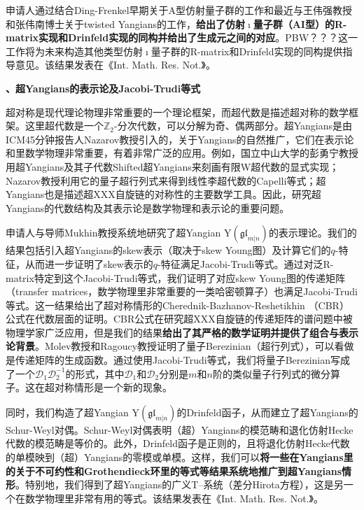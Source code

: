 \documentclass[12pt,UTF8,AutoFakeBold=4,a4paper]{ctexart}
\begin{document}
申请人通过结合Ding-Frenkel早期关于A型仿射量子群的工作和最近与王伟强教授和张伟南博士关于twisted Yangians的工作，\textbf{给出了仿射$\imath$量子群（AI型）的R-matrix实现和Drinfeld实现的同构并给出了生成元之间的对应}。PBW？？？这一工作将为未来构造其他类型仿射$\imath$量子群的R-matrix和Drinfeld实现的同构提供指导意见。该结果发表在《Int. Math. Res. Not.》。

\medskip

\textbf{、超Yangians的表示论及Jacobi-Trudi等式}

超对称是现代理论物理非常重要的一个理论框架，而超代数是描述超对称的数学框架。这里超代数是一个$\mathbb Z_2$-分次代数，可以分解为奇、偶两部分。超Yangians是由ICM45分钟报告人Nazarov教授引入的，关于Yangians的自然推广，它们在表示论和里数学物理非常重要，有着非常广泛的应用。例如，国立中山大学的彭勇宁教授用超Yangians及其子代数Shifted超Yangians来刻画有限W超代数的显式实现；Nazarov教授利用它的量子超行列式来得到线性李超代数的Capelli等式；超Yangians也是描述超XXX自旋链的对称性的主要数学工具。因此，研究超Yangians的代数结构及其表示论是数学物理和表示论的重要问题。

申请人与导师Mukhin教授系统地研究了超Yangian $\mathrm{Y}(\mathfrak{gl}_{m|n})$的表示理论。我们的结果包括引入超Yangians的skew表示（取决于skew Young图）及计算它们的$q$-特征，从而进一步证明了skew表示的$q$-特征满足Jacobi-Trudi等式。通过对泛R-matrix特定到这个Jacobi-Trudi等式，我们证明了对应skew Young图的传递矩阵（transfer matrices，数学物理里非常重要的一类哈密顿算子）也满足Jacobi-Trudi等式。这一结果给出了超对称情形的Cherednik-Bazhanov-Reshetikhin （CBR）公式在代数层面的证明。CBR公式在研究超XXX自旋链的传递矩阵的谱问题中被物理学家广泛应用，但是我们的结果\textbf{给出了其严格的数学证明并提供了组合与表示论背景}。Molev教授和Ragoucy教授证明了量子Berezinian（超行列式），可以看做是传递矩阵的生成函数。通过使用Jacobi-Trudi等式，我们将量子Berezinian写成了一个$\mathcal D_1\mathcal D_2^{-1}$的形式，其中$\mathcal D_1$和$\mathcal D_2$分别是$m$和$n$阶的类似量子行列式的微分算子。这在超对称情形是一个新的现象。

同时，我们构造了超Yangian $\mathrm{Y}(\mathfrak{gl}_{m|n})$的Drinfeld函子，从而建立了超Yangians的Schur-Weyl对偶。Schur-Weyl对偶表明（超）Yangians的模范畴和退化仿射Hecke代数的模范畴是等价的。此外，Drinfeld函子是正则的，且将退化仿射Hecke代数的单模映到（超）Yangians的零模或单模。这样，我们可以\textbf{将一些在Yangians里的关于不可约性和Grothendieck环里的等式等结果系统地推广到超Yangians情形}。特别地，我们得到了超Yangians的广义T--系统（差分Hirota方程），这是另一个在数学物理里非常有用的等式。该结果发表在《Int. Math. Res. Not.》。
\end{document}
